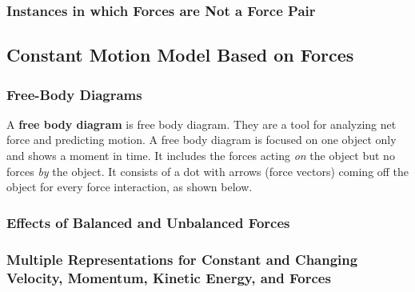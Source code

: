\documentclass[dvipsnames]{article}
\begin{document}
\subsubsection{Instances in which Forces are Not a Force Pair}

\subsection{Constant Motion Model Based on Forces}

\subsubsection{Free-Body Diagrams}

A \textbf{\gls{free body diagram}} is \glsdesc{free body diagram}. They are a tool for analyzing net force and predicting motion. A free body diagram is focused on one object only and shows a moment in time. It includes the forces acting \textit{on} the object but no forces \textit{by} the object. It consists of a dot with arrows (force vectors) coming off the object for every force interaction, as shown below.

\begin{center}
\end{center}

\subsubsection{Effects of Balanced and Unbalanced Forces}

\subsubsection{Multiple Representations for Constant and Changing Velocity, Momentum, Kinetic Energy, and Forces}



\end{document}
